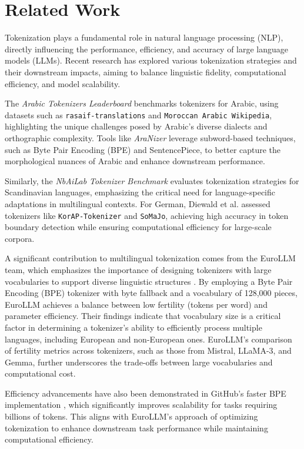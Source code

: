 \section{Related Work}

Tokenization plays a fundamental role in natural language processing (NLP), directly influencing the performance, efficiency, and accuracy of large language models (LLMs). Recent research has explored various tokenization strategies and their downstream impacts, aiming to balance linguistic fidelity, computational efficiency, and model scalability.

The \textit{Arabic Tokenizers Leaderboard} \cite{rashad_arabic_nodate} benchmarks tokenizers for Arabic, using datasets such as \texttt{rasaif-translations} and \texttt{Moroccan Arabic Wikipedia}, highlighting the unique challenges posed by Arabic's diverse dialects and orthographic complexity. Tools like \textit{AraNizer} \cite{koubaa_githubcomriotu-labaranizer_2024} leverage subword-based techniques, such as Byte Pair Encoding (BPE) and SentencePiece, to better capture the morphological nuances of Arabic and enhance downstream performance.

Similarly, the \textit{NbAiLab Tokenizer Benchmark} \cite{rosa_nbailabtokenizer-benchmark_2024} evaluates tokenization strategies for Scandinavian languages, emphasizing the critical need for language-specific adaptations in multilingual contexts. For German, Diewald et al. \cite{diewald_tokenizing_2022} assessed tokenizers like \texttt{KorAP-Tokenizer} and \texttt{SoMaJo}, achieving high accuracy in token boundary detection while ensuring computational efficiency for large-scale corpora.

A significant contribution to multilingual tokenization comes from the EuroLLM team, which emphasizes the importance of designing tokenizers with large vocabularies to support diverse linguistic structures \cite{martins_eurollm_2024}. By employing a Byte Pair Encoding (BPE) tokenizer with byte fallback and a vocabulary of 128,000 pieces, EuroLLM achieves a balance between low fertility (tokens per word) and parameter efficiency. Their findings indicate that vocabulary size is a critical factor in determining a tokenizer’s ability to efficiently process multiple languages, including European and non-European ones. EuroLLM's comparison of fertility metrics across tokenizers, such as those from Mistral, LLaMA-3, and Gemma, further underscores the trade-offs between large vocabularies and computational cost.

Efficiency advancements have also been demonstrated in GitHub's faster BPE implementation \cite{neubeck_so_2024}, which significantly improves scalability for tasks requiring billions of tokens. This aligns with EuroLLM’s approach of optimizing tokenization to enhance downstream task performance while maintaining computational efficiency.

